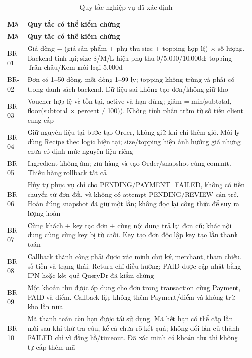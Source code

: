 \begingroup\footnotesize\setlength{\tabcolsep}{3pt}
\begin{longtable}{|>{\raggedright\arraybackslash}p{}|>{\raggedright\arraybackslash}p{}|}
\caption{Quy tắc nghiệp vụ đã xác định}\\\hline
\textbf{Mã} & \textbf{Quy tắc có thể kiểm chứng} \\ \hline
\endfirsthead
\hline
\textbf{Mã} & \textbf{Quy tắc có thể kiểm chứng} \\ \hline
\endhead
BR-01 & Giá dòng = (giá sản phẩm + phụ thu size + topping hợp lệ) \(\times\) số lượng. Backend tính lại; size S/M/L hiện phụ thu 0/5.000/10.000đ; topping Trân châu/Kem mỗi loại 5.000đ \\ \hline
BR-02 & Đơn có 1--50 dòng, mỗi dòng 1--99 ly; topping không trùng và phải có trong danh sách backend. Dữ liệu sai không tạo đơn/không giữ kho \\ \hline
BR-03 & Voucher hợp lệ về tồn tại, active và hạn dùng; giảm = min(subtotal, floor(subtotal \(\times\) percent / 100)). Không tính phần trăm từ số tiền client cung cấp \\ \hline
BR-04 & Giữ nguyên liệu tại bước tạo Order, không giữ khi chỉ thêm giỏ. Mỗi ly dùng Recipe theo logic hiện tại; size/topping hiện ảnh hưởng giá nhưng chưa có định mức nguyên liệu riêng \\ \hline
BR-05 & Ingredient không âm; giữ hàng và tạo Order/snapshot cùng commit. Thiếu hàng rollback tất cả \\ \hline
BR-06 & Hủy tự phục vụ chỉ cho PENDING/PAYMENT\_FAILED, không có tiền chuyển từ đơn đổi, và không có attempt PENDING/REVIEW cản trở. Hoàn đúng snapshot đã giữ một lần; không đọc lại công thức để suy ra lượng hoàn \\ \hline
BR-07 & Cùng khách + key tạo đơn + cùng nội dung trả lại đơn cũ; khác nội dung dùng cùng key bị từ chối. Key tạo đơn độc lập key tạo lần thanh toán \\ \hline
BR-08 & Callback thành công phải được xác minh chữ ký, merchant, tham chiếu, số tiền và trạng thái. Return chỉ điều hướng; PAID được cập nhật bằng IPN hoặc kết quả QueryDr đã kiểm chứng \\ \hline
BR-09 & Một khoản thu được áp dụng cho đơn trong transaction cùng Payment, PAID và điểm. Callback lặp không thêm Payment/điểm và không trừ kho lần nữa \\ \hline
BR-10 & Mã thanh toán còn hạn được tái sử dụng. Mã hết hạn có thể cấp lần mới sau khi thử tra cứu, kể cả chưa rõ kết quả; không đổi lần cũ thành FAILED chỉ vì đồng hồ/timeout. Đã xác minh có khoản thu thì không tự cấp thêm mã \\ \hline

\end{longtable}

